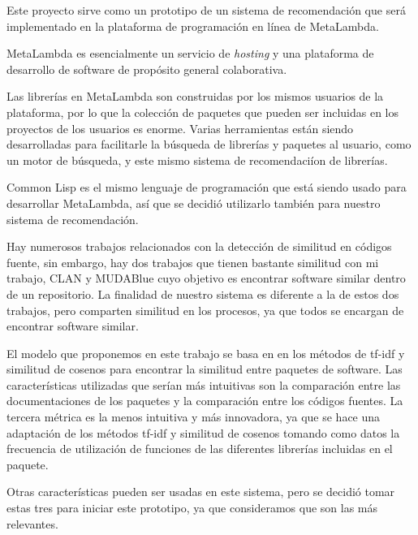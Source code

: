 \documentclass[times, 10pt,twocolumn, a4paper]{article}
\begin{document}
\label{Motivacion}

Este proyecto sirve como un prototipo de un sistema de recomendaci\'on
que ser\'a implementado en la plataforma de programaci\'on en l\'inea de
MetaLambda.

MetaLambda es esencialmente un servicio de \textit{hosting} y una
plataforma de desarrollo de software de prop\'osito general
colaborativa.

Las librer\'ias en MetaLambda son construidas por los mismos usuarios
de la plataforma, por lo que la colecci\'on de paquetes que pueden ser
incluidas en los proyectos de los usuarios es enorme. Varias
herramientas est\'an siendo desarrolladas para facilitarle la
b\'usqueda de librer\'ias y paquetes al usuario, como un motor de
b\'usqueda, y este mismo sistema de recomendaci\'ion de librer\'ias.

Common Lisp es el mismo lenguaje de programaci\'on que est\'a siendo
usado para desarrollar MetaLambda, as\'i que se decidi\'o utilizarlo
tambi\'en para nuestro sistema de
recomendaci\'on.


Hay numerosos trabajos relacionados con la detecci\'on de similitud en
c\'odigos fuente, sin embargo, hay dos trabajos que tienen bastante
similitud con mi trabajo, CLAN \cite{ml1} y MUDABlue \cite{ml2} cuyo objetivo es encontrar software similar
dentro de un repositorio. La finalidad de nuestro sistema es diferente a la
de estos dos trabajos, pero comparten similitud en los procesos, ya
que todos se encargan de encontrar software similar.


El modelo que proponemos en este trabajo se basa en en los m\'etodos
de tf-idf y similitud de cosenos para encontrar la similitud entre
paquetes de software. Las caracter\'isticas utilizadas que ser\'ian m\'as
intuitivas son la comparaci\'on entre las documentaciones de los
paquetes y la comparaci\'on entre los c\'odigos fuentes. La tercera
m\'etrica es la menos intuitiva y m\'as innovadora, ya que se hace una
adaptaci\'on de los m\'etodos tf-idf y similitud de cosenos tomando
como datos la frecuencia de utilizaci\'on de funciones de las
diferentes librer\'ias incluidas en el paquete.

Otras caracter\'isticas pueden ser usadas en este sistema, pero se
decidi\'o tomar estas tres para iniciar este prototipo, ya que
consideramos que son las m\'as relevantes.
\end{document}
